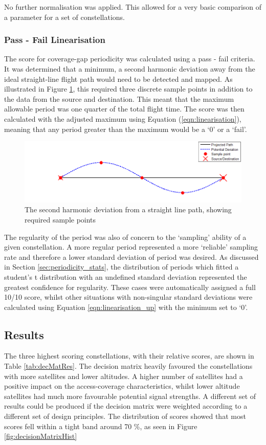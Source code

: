 No further normalisation was applied. This allowed for a very basic comparison of a parameter for a set of constellations. 

\subsubsection{Pass - Fail Linearisation}
The score for coverage-gap periodicity was calculated using a pass - fail criteria. It was determined that a minimum, a second harmonic deviation away from the ideal straight-line flight path would need to be detected and mapped. As illustrated in Figure \ref{fig:2ndHarmonic}, this required three discrete sample points in addition to the data from the source and destination. This meant that the maximum allowable period was one quarter of the total flight time. The score was then calculated with the adjusted maximum using Equation (\ref{eqn:linearisation}), meaning that any period greater than the maximum would be a `0' or a `fail'.
\begin{figure}[H]
	\centering
	\includegraphics[scale = 0.75]{Pictures/2ndHarmonic.png}
	
	\caption{The second harmonic deviation from a straight line path, showing required sample points}
	\label{fig:2ndHarmonic}
\end{figure}
The regularity of the period was also of concern to the `sampling' ability of a given constellation. A more regular period represented a more `reliable' sampling rate and therefore a lower standard deviation of period was desired. As discussed in Section \ref{sec:periodicity_stats}, the distribution of periods which fitted a student's t distribution with an undefined standard deviation represented the greatest confidence for regularity. These cases were automatically assigned a full 10/10 score, whilst other situations with non-singular standard deviations were calculated using Equation \ref{eqn:linearisation_up} with the minimum set to `0'.

\subsection{Results}
The three highest scoring constellations, with their relative scores, are shown in Table \ref{tab:decMatRes}. The decision matrix heavily favoured the constellations with more satellites and lower altitudes. A higher number of satellites had a positive impact on the access-coverage characteristics, whilst lower altitude satellites had much more favourable potential signal strengths. A different set of results could be produced if the decision matrix were weighted according to a different set of design principles. The distribution of scores showed that most scores fell within a tight band around 70 \%, as seen in Figure \ref{fig:decisionMatrixHist}

